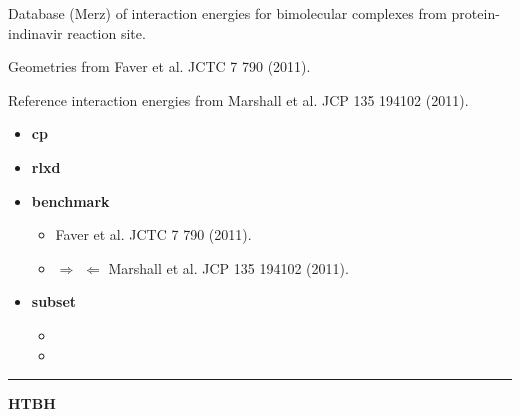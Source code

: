 \documentclass[letterpaper,10pt,english]{sphinxmanual}
\begin{document}
\begin{DUlineblock}{0em}
\item[] Database (Merz) of interaction energies for bimolecular complexes from protein-indinavir reaction site.
\item[] Geometries from Faver et al. JCTC 7 790 (2011).
\item[] Reference interaction energies from Marshall et al. JCP 135 194102 (2011).
\end{DUlineblock}
\begin{itemize}
\item {} 
\textbf{cp}   \textbar{}\textbar{} 

\item {} 
\textbf{rlxd} 

\item {} 
\textbf{benchmark}
\begin{itemize}
\item {} 
 Faver et al. JCTC 7 790 (2011).

\item {} 
$\Rightarrow$  $\Leftarrow$ Marshall et al. JCP 135 194102 (2011).

\end{itemize}

\item {} 
\textbf{subset}
\begin{itemize}
\item {} 

\item {} 

\end{itemize}

\end{itemize}


\bigskip\hrule{}\bigskip

\label{index:module-HTBH}
\textbf{HTBH}
\end{document}
